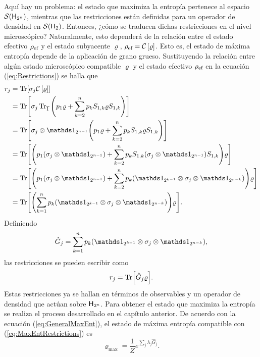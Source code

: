 Aquí hay un problema: el estado que maximiza la entropía pertenece al espacio $\mathcal{S}({\sf H}_{2^{n}})$, mientras que las restricciones están definidas para un operador de densidad en $\mathcal{S}({\sf H}_{2})$. Entonces, ¿cómo se traducen dichas restricciones en el nivel microscópico? Naturalmente, esto dependerá de la relación entre el estado efectivo $\rho_{\text{ef}}$ y el estado subyacente $\varrho$, $\rho_{\text{ef}}=\mathcal{C}\left[\varrho\right]$. Esto es, el estado de máxima entropía depende de la aplicación de grano grueso. Sustituyendo la relación entre algún estado microscópico compatible $\varrho$ y el estado efectivo $\rho_{\text{ef}}$ en la ecuación (\ref{eq:Restrictions}) se halla que
\begin{align}
    r_{j}&=\Tr[\sigma_{j}\CG{\varrho}]\nonumber\\
    &=\Tr[\sigma_{j}\Tr_{\overline{1}}\qty(p_{1}\varrho+\sum_{k=2}^{n}p_{k}S_{1,k}\varrho S_{1,k})]\nonumber\\
    &=\Tr[\sigma_{j}\otimes\Id_{2^{n-1}}\qty(p_{1}\varrho+\sum_{k=2}^{n}p_{k}S_{1,k}\varrho S_{1,k})]\nonumber\\
    &=\Tr[\qty(p_{1}(\sigma_{j}\otimes\Id_{2^{n-1}})+\sum_{k=2}^{n}p_{k}S_{1,k}(\sigma_{j}\otimes\Id_{2^{n-1}})S_{1,k})\varrho]\nonumber\\
    &=\Tr[\qty(p_{1}(\sigma_{j}\otimes\Id_{2^{n-1}})+\sum_{k=2}^{n}p_{k}(\Id_{2^{k-1}}\otimes\sigma_{j}\otimes\Id_{2^{n-k}}))\varrho]\nonumber\\
    &=\Tr[\qty(\sum_{k=1}^{n}p_{k}(\Id_{2^{k-1}}\otimes\sigma_{j}\otimes\Id_{2^{n-k}}))\varrho]\nonumber.
\end{align}
Definiendo
\begin{equation}\label{eq:GhatNM}
    \hat{G}_{j}=\sum_{k=1}^{n}p_{k}(\Id_{2^{k-1}}\otimes\sigma_{j}\otimes\Id_{2^{n-k}}),
\end{equation}
las restricciones se pueden escribir como
\begin{equation}\label{eq:MaxEntRestrictions}
    r_{j}=\Tr[\hat{G}_{j}\varrho].
\end{equation}
Estas restricciones ya se hallan en términos de observables y un operador de densidad que actúan sobre ${\sf H}_{2^{n}}$. Para obtener el estado que maximiza la entropía se realiza el proceso desarrollado en el capítulo anterior. De acuerdo con la ecuación (\ref{eq:GeneralMaxEnt}), el estado de máxima entropía compatible con (\ref{eq:MaxEntRestrictions}) es
\begin{equation}\label{eq:MaxEntLagMult}
    \varrho_{\max}=\frac{1}{Z}e^{\sum_{j}\lambda_{j}\hat{G}_{j}}.
\end{equation}
